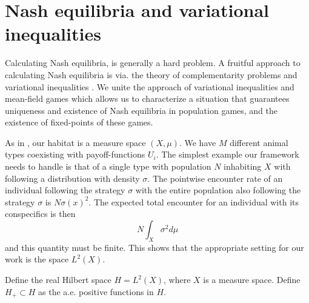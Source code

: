 \section{Nash equilibria and variational inequalities}
Calculating Nash equilibria,  is generally a hard problem. A fruitful approach to calculating Nash equilibria is via. the theory of complementarity problems and variational inequalities \citep{karamardian1969nonlinear,nabetani2011parametrized}. We unite the approach of variational inequalities and mean-field games which allows us to characterize a situation that guarantees uniqueness and existence of Nash equilibria in population games, and the existence of fixed-points of these games.


As in , our habitat is a measure space $(X,\mu)$. We have $M$ different animal types coexisting with payoff-functions $U_i$. The simplest example our framework needs to handle is that of a single type with population $N$ inhabiting $X$ with following a distribution with density $\sigma$. The pointwise encounter rate of an individual following the strategy $\sigma$ with the entire population also following the strategy $\sigma$ is $N\sigma(x)^2$. The expected total encounter for an individual with its conspecifics is then
\begin{equation}
  N\int_X \sigma^2 d\mu
\end{equation}
and this quantity must be finite. This shows that the appropriate setting for our work is the space $L^2(X)$.
\begin{definition}
  Define the real Hilbert space $H=L^2(X)$, where $X$ is a measure space. Define $H_+ \subset H$ as the a.e. positive functions in $H$.
\end{definition}

